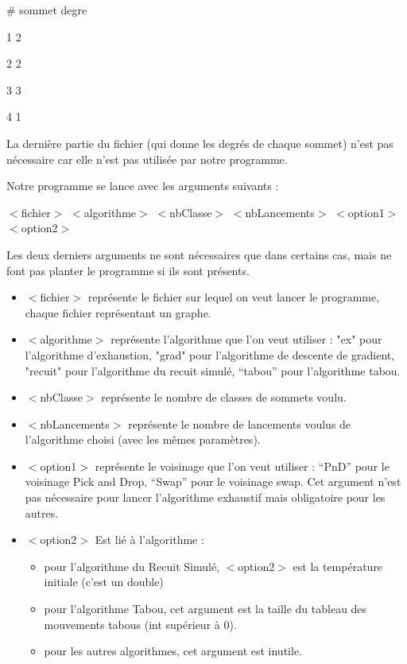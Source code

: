 \documentclass[12pt]{article}
\begin{document}
\# sommet degre

1 2

2 2

3 3

4 1

La dernière partie du fichier (qui donne les degrés de chaque sommet) n’est pas nécessaire car elle n’est pas utilisée par notre programme.
\bigskip

Notre programme se lance avec les arguments suivants :

   $<$fichier$>$ $<$algorithme$>$ $<$nbClasse$>$ $<$nbLancements$>$ $<$option1$>$ $<$option2$>$

\bigskip
   Les deux derniers arguments ne sont nécessaires que dans certains cas, mais ne font pas planter le programme si ils sont présents.

	\begin{itemize}
   \item $<$fichier$>$ représente le fichier sur lequel on veut lancer le programme, chaque fichier représentant un graphe.

  \item  $<$algorithme$>$ représente l'algorithme que l'on veut utiliser : "ex" pour l'algorithme d'exhaustion, "grad" pour l'algorithme de descente de gradient, "recuit" pour l'algorithme du recuit simulé, “tabou” pour l’algorithme tabou.

   \item $<$nbClasse$>$ représente le nombre de classes de sommets voulu.

	\item $<$nbLancements$>$ représente le nombre de lancements voulus de l'algorithme choisi (avec les mêmes paramètres).

   \item $<$option1$>$ représente le voisinage que l’on veut utiliser : “PnD” pour le voisinage Pick and Drop, “Swap” pour le voisinage swap. Cet argument n’est pas nécessaire pour lancer l’algorithme exhaustif mais obligatoire pour les autres.

   \item $<$option2$>$ Est lié à l’algorithme :
		\begin{itemize}
		\item pour l’algorithme du Recuit Simulé, $<$option2$>$ est la température initiale (c’est un double)
		\item pour l’algorithme Tabou, cet argument est la taille du tableau des mouvements tabous (int supérieur à 0).
    	\item pour les autres algorithmes, cet argument est inutile.
    	\end{itemize}
	\end{itemize}
	
\end{document}
